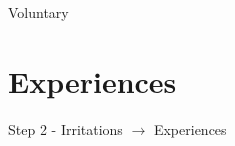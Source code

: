 \documentclass[
  17pt,
  letterpaper,
  ignorenonframetext,
  aspectratio=169,
]{beamer}
\begin{document}
\begin{frame}{Voluntary}
\protect\hypertarget{voluntary}{}
\end{frame}

\hypertarget{experiences}{%
\section{Experiences}\label{experiences}}

\begin{frame}{Step 2 - Irritations \(\rightarrow\) Experiences}
\protect\hypertarget{step-2---irritations-rightarrow-experiences}{}
\end{frame}
\end{document}
